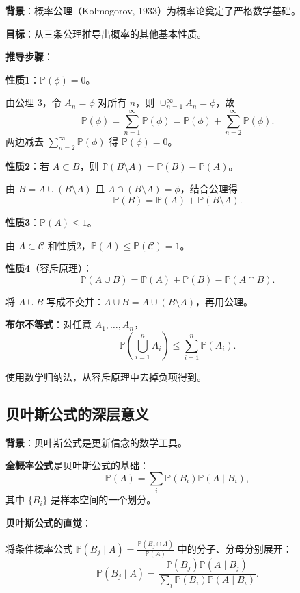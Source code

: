\textbf{背景}：概率公理（Kolmogorov, 1933）为概率论奠定了严格数学基础。

\textbf{目标}：从三条公理推导出概率的其他基本性质。

\textbf{推导步骤}：

\textbf{性质1}：$\mathbb{P}(\phi) = 0$。

由公理 3，令 $A_n = \phi$ 对所有 $n$，则 $\cup_{n=1}^{\infty} A_n = \phi$，故
\[
\mathbb{P}(\phi) = \sum_{n=1}^{\infty} \mathbb{P}(\phi) = \mathbb{P}(\phi) + \sum_{n=2}^{\infty} \mathbb{P}(\phi).
\]
两边减去 $\sum_{n=2}^{\infty} \mathbb{P}(\phi)$ 得 $\mathbb{P}(\phi) = 0$。

\textbf{性质2}：若 $A \subset B$，则 $\mathbb{P}(B \setminus A) = \mathbb{P}(B) - \mathbb{P}(A)$。

由 $B = A \cup (B \setminus A)$ 且 $A \cap (B \setminus A) = \phi$，结合公理得
\[
\mathbb{P}(B) = \mathbb{P}(A) + \mathbb{P}(B \setminus A).
\]

\textbf{性质3}：$\mathbb{P}(A) \leq 1$。

由 $A \subset \mathcal{C}$ 和性质2，$\mathbb{P}(A) \leq \mathbb{P}(\mathcal{C}) = 1$。

\textbf{性质4}（容斥原理）：
\[
\mathbb{P}(A \cup B) = \mathbb{P}(A) + \mathbb{P}(B) - \mathbb{P}(A \cap B).
\]

将 $A \cup B$ 写成不交并：$A \cup B = A \cup (B \setminus A)$，再用公理。

\textbf{布尔不等式}：对任意 $A_1, \ldots, A_n$，
\[
\mathbb{P}\left(\bigcup_{i=1}^{n} A_i\right) \leq \sum_{i=1}^{n} \mathbb{P}(A_i).
\]

使用数学归纳法，从容斥原理中去掉负项得到。

\subsection{贝叶斯公式的深层意义}\label{sec:derivation-bayes-insight}

\textbf{背景}：贝叶斯公式是更新信念的数学工具。

\textbf{全概率公式}是贝叶斯公式的基础：
\[
\mathbb{P}(A) = \sum_i \mathbb{P}(B_i) \mathbb{P}(A \mid B_i),
\]
其中 $\{B_i\}$ 是样本空间的一个划分。

\textbf{贝叶斯公式的直觉}：

将条件概率公式 $\mathbb{P}(B_j \mid A) = \frac{\mathbb{P}(B_j \cap A)}{\mathbb{P}(A)}$ 中的分子、分母分别展开：
\[
\mathbb{P}(B_j \mid A) = \frac{\mathbb{P}(B_j) \mathbb{P}(A \mid B_j)}{\sum_i \mathbb{P}(B_i) \mathbb{P}(A \mid B_i)}.
\]

